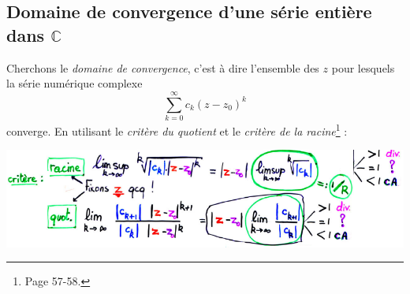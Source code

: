\documentclass[11pt, a4paper, openany]{book}
\newcommand{\series}{\sum_{k=0}^\infty}
\begin{document}
\subsection{Domaine de convergence d'une série entière dans $\mathbb{C}$}
Cherchons le \textit{domaine de convergence}, c'est à dire l'ensemble des $z$ pour lesquels la série numérique complexe
\begin{equation}
	\series c_k(z-z_0)^k
\end{equation}
converge.
En utilisant le \textit{critère du quotient} et le \textit{critère de la racine}\footnote{Page 57-58.} :
\begin{center}
	\includegraphics[scale=0.55]{image12.png}
\end{center}
					
\end{document}
